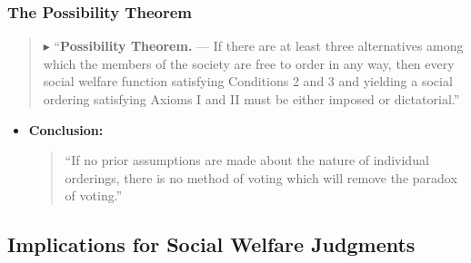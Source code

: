 \documentclass{beamer}
\begin{document}
\begin{frame}
    \frametitle{The Possibility Theorem}
    \begin{quote}$\blacktriangleright$
        ``\textbf{Possibility Theorem.} --- If there are at least three alternatives among which the members of the society are free to order in any way, then every social welfare function satisfying Conditions 2 and 3 and yielding a social ordering satisfying Axioms I and II must be either imposed or dictatorial.''
    \end{quote}
    \vspace{0.5 cm}
    \begin{itemize}
        \item \textbf{Conclusion:}
        \begin{quote}
        ``If no prior assumptions are made about the nature of individual orderings, there is no method of voting which will remove the paradox of voting.''
        \end{quote}
        
    \end{itemize}
\end{frame}

\subsection{Implications for Social Welfare Judgments}
\end{document}
